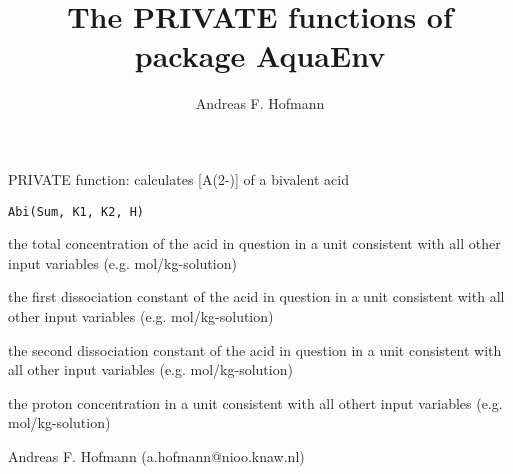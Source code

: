 \documentclass{article}
\title{The PRIVATE functions of package AquaEnv}
\author{Andreas F. Hofmann}
\begin{document}
\maketitle

\begin{Description}\relax
PRIVATE function: calculates [A(2-)] of a bivalent acid
\end{Description}
\begin{Usage}
\begin{verbatim}Abi(Sum, K1, K2, H)\end{verbatim}
\end{Usage}
\begin{Arguments}
\begin{ldescription}
\item[\code{Sum }] the total concentration of the acid in question in a unit consistent with all other input variables (e.g. mol/kg-solution)
\item[\code{K1 }] the first dissociation constant of the acid in question in a unit consistent with all other input variables (e.g. mol/kg-solution)
\item[\code{K2 }] the second dissociation constant of the acid in question in a unit consistent with all other input variables (e.g. mol/kg-solution)
\item[\code{H }] the proton concentration in a unit consistent with all othert input variables (e.g. mol/kg-solution)
\end{ldescription}
\end{Arguments}
\begin{Author}\relax
Andreas F. Hofmann (a.hofmann@nioo.knaw.nl)
\end{Author}
\end{document}
